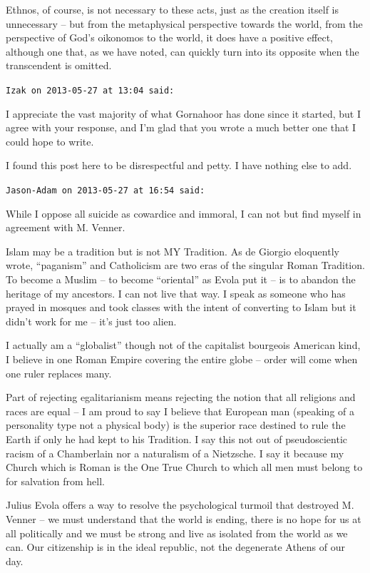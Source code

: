\begin{footnotesize}
\begin{sffamily}
Ethnos, of course, is not necessary to these acts, just as the creation itself is unnecessary -- but from the metaphysical perspective towards the world, from the perspective of God's oikonomos to the world, it does have a positive effect, although one that, as we have noted, can quickly turn into its opposite when the transcendent is omitted.

\hfill

\texttt{Izak on 2013-05-27 at 13:04 said:}

I appreciate the vast majority of what Gornahoor has done since it started, but I agree with your response, and I'm glad that you wrote a much better one that I could hope to write.

I found this post here to be disrespectful and petty. I have nothing else to add.

\hfill

\texttt{Jason-Adam on 2013-05-27 at 16:54 said:}

While I oppose all suicide as cowardice and immoral, I can not but find myself in agreement with M. Venner.

Islam may be a tradition but is not MY Tradition. As de Giorgio eloquently wrote, ``paganism'' and Catholicism are two eras of the singular Roman Tradition. To become a Muslim -- to become ``oriental'' as Evola put it -- is to abandon the heritage of my ancestors. I can not live that way. I speak as someone who has prayed in mosques and took classes with the intent of converting to Islam but it didn't work for me -- it's just too alien.

I actually am a ``globalist'' though not of the capitalist bourgeois American kind, I believe in one Roman Empire covering the entire globe -- order will come when one ruler replaces many.

Part of rejecting egalitarianism means rejecting the notion that all religions and races are equal -- I am proud to say I believe that European man (speaking of a personality type not a physical body) is the superior race destined to rule the Earth if only he had kept to his Tradition. I say this not out of pseudoscientic racism of a Chamberlain nor a naturalism of a Nietzsche. I say it because my Church which is Roman is the One True Church to which all men must belong to for salvation from hell.

Julius Evola offers a way to resolve the psychological turmoil that destroyed M. Venner -- we must understand that the world is ending, there is no hope for us at all politically and we must be strong and live as isolated from the world as we can. Our citizenship is in the ideal republic, not the degenerate Athens of our day.


\end{sffamily}
\end{footnotesize}
